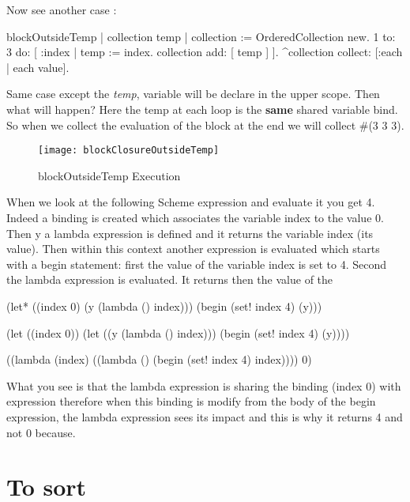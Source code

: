 \documentclass[a4paper,10pt,twoside]{book}
\begin{document}
\newpage
Now see another case : 
\begin{code}{}
blockOutsideTemp
		| collection temp |
		collection := OrderedCollection new.
		1 to: 3 do: [ :index | 
			temp := index. 
			collection add: [ temp ] ].
		^collection collect: [:each | each value].
\end{code}
Same case except the \emph{temp}, variable will be  declare in the upper scope. Then what will happen? Here the temp at each loop is the \textbf{same} shared variable bind. So when we collect the evaluation of the block at the end we will collect \#(3 3 3).
\begin{figure}[htbp]
	\centering
		\texttt{[image: blockClosureOutsideTemp]}
	\caption{blockOutsideTemp Execution}
	\label{fig:blockClosureOutsideTemp}
\end{figure}




When we look at the following Scheme expression and evaluate it you get 4. Indeed a binding is created 
which associates the variable index to the value 0. Then y a lambda expression is defined and it returns
 the variable index (its value). Then within this context another expression is evaluated which starts
with a begin statement: first the value of the variable index is set to 4. Second the lambda expression is 
evaluated. It returns then the value of the 

\begin{code}{}
(let* ((index 0)
       (y (lambda () index)))
  (begin
    (set! index 4)
    (y)))
\end{code}

\begin{code}{}
(let ((index 0))
  (let ((y (lambda () index)))
    (begin
      (set! index 4)
      (y))))
\end{code}

\begin{code}{}
((lambda (index)
   ((lambda () (begin 
                (set! index 4)
                index))))
 0)
\end{code}


What you see is that the lambda expression is sharing the binding (index 0) with expression 
therefore when this binding is modify from the body of the begin expression, the lambda expression sees its impact
and this is why it returns 4 and not 0 because. 


\section{To sort}
\end{document}
